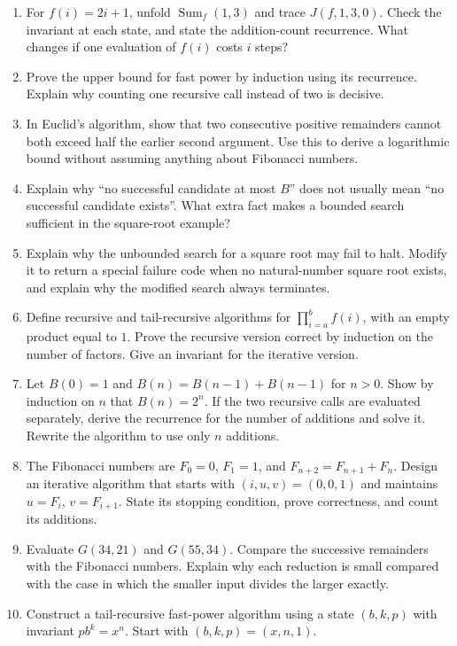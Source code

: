 \begin{enumerate}
time for $2^{60}$ steps. How much does a thousandfold speed-up increase the
input size possible in a fixed time? Compare with an algorithm taking $n^2$
steps.
\item For $f(i)=2i+1$, unfold $\operatorname{Sum}_f(1,3)$ and trace
$J(f,1,3,0)$. Check the invariant at each state, and state the addition-count
recurrence. What changes if one evaluation of $f(i)$ costs $i$ steps?
\item Prove the upper bound for fast power by induction using its recurrence.
Explain why counting one recursive call instead of two is decisive.
\item In Euclid's algorithm, show that two consecutive positive remainders
cannot both exceed half the earlier second argument. Use this to derive
a logarithmic bound without assuming anything about Fibonacci numbers.
\item Explain why ``no successful candidate at most $B$'' does not usually
mean ``no successful candidate exists''. What extra fact makes a bounded
search sufficient in the square-root example?
\item Explain why the unbounded search for a square root may fail to halt.
Modify it to return a special failure code when no natural-number square root
exists, and explain why the modified search always terminates.
\item Define recursive and tail-recursive algorithms for
$\prod_{i=a}^{b}f(i)$, with an empty product equal to $1$. Prove the recursive
version correct by induction on the number of factors. Give an invariant
for the iterative version.
\item Let $B(0)=1$ and $B(n)=B(n-1)+B(n-1)$ for $n>0$. Show by induction
on $n$ that $B(n)=2^n$. If the two recursive calls are evaluated separately,
derive the recurrence for the number of additions and solve it. Rewrite the
algorithm to use only $n$ additions.
\item The Fibonacci numbers are $F_0=0$, $F_1=1$, and
$F_{n+2}=F_{n+1}+F_n$. Design an iterative algorithm that starts with
$(i,u,v)=(0,0,1)$ and maintains $u=F_i$, $v=F_{i+1}$. State its stopping
condition, prove correctness, and count its additions.
\item Evaluate $G(34,21)$ and $G(55,34)$. Compare the successive remainders
with the Fibonacci numbers. Explain why each reduction is small compared
with the case in which the smaller input divides the larger exactly.
\item Construct a tail-recursive fast-power algorithm using a state $(b,k,p)$
with invariant $p b^k=x^n$. Start with $(b,k,p)=(x,n,1)$.

\end{enumerate}
